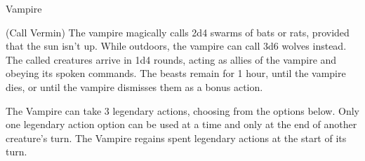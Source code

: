 \begin{DndMonster}[width=\textwidth + 8pt]{Vampire}
\begin{multicols}{2}
\DndMonsterAction(Call Vermin)
The vampire magically calls 2d4 swarms of bats or rats, provided that the sun isn't up. While outdoors, the vampire can call 3d6 wolves instead. The called creatures arrive in 1d4 rounds, acting as allies of the vampire and obeying its spoken commands. The beasts remain for 1 hour, until the vampire dies, or until the vampire dismisses them as a bonus action.

The Vampire can take 3 legendary actions, choosing from the options below. Only one legendary action option can be used at a time and only at the end of another creature's turn. The Vampire regains spent legendary actions at the start of its turn.
\begin{DndMonsterLegendaryActions}
\end{DndMonsterLegendaryActions}
\end{multicols}
\end{DndMonster}

